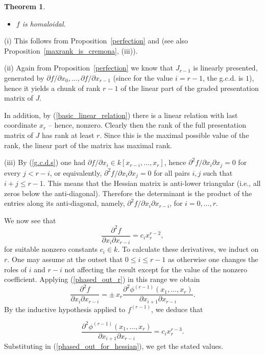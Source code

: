 \documentclass[11pt]{article}   %
\newtheorem{Theorem}{Theorem}
\theoremstyle{definition}
\numberwithin{Theorem}{section} \numberwithin{equation}{section}
\def\demo{\noindent{\it Proof. }}
\begin{document}
{\begin{Theorem}
\begin{itemize}
\item[{\rm (iv)}] $f$ is homaloidal.
\end{itemize}
\end{Theorem}
\demo (i) This follows from Proposition~\ref{perfection} and
\cite[Example 2.4]{cremona} (see also
Proposition~\ref{maxrank_is_cremona}, (iii)).

\medskip

(ii)  Again from Proposition~\ref{perfection}  we know that
$J_{r-1}$ is linearly presented, generated by $\partial f/\partial
x_0,\ldots,\partial f/\partial x_{r-1}$ (since for the value
$i=r-1$, the g.c.d. is $1$), hence it yields a chunk of rank $r-1$
of the linear part of the graded presentation matrix of $J$.

In addition, by (\ref{basic_linear_relation}) there is a linear
relation with last coordinate $x_r$ -- hence, nonzero. Clearly then
the rank of the full presentation matrix of $J$ has rank at least
$r$. Since this is the maximal possible value of the rank, the
linear part of the matrix has maximal rank.

\medskip

(iii) By (\ref{g.c.d.s}) one had $\partial f/\partial x_i\in
k[x_{r-i},\ldots, x_r]$, hence $\partial^2f/\partial x_i\partial
x_j=0$ for every $j<r-i$, or equivalently,  $\partial^2f/\partial
x_i\partial x_j=0$ for all pairs $i,j$ such that $i+j\leq r-1$. This
means that the Hessian matrix is anti-lower triangular (i.e., all
zeros below the anti-diagonal). Therefore the determinant is the
product of the entries along its anti-diagonal, namely,
$\partial^2f/\partial x_i\partial x_{r-i}$, for $i=0,\ldots, r$.

We now see that
$$\frac{\partial^2f}{\partial x_i\partial x_{r-i}}=c_ix_r^{r-2},$$
for suitable nonzero constants $c_i\in k$.
 To calculate these derivatives, we induct on $r$.
 One may assume at the outset that $0\leq i\leq r-1$ as otherwise
 one changes the roles of $i$ and $r-i$ not affecting the result except
for the value of the nonzero coefficient. Applying
(\ref{phased_out_r}) in this range we obtain
\begin{equation}\label{phased_out_for_hessian}
\frac{\partial^2f}{\partial x_i\partial x_{r-i}}=\pm\,
x_r\frac{\partial^2\phi^{(r-1)}(x_1,\ldots,x_r)}{\partial
x_{i+1}\partial x_{r-i}}. \end{equation} By the inductive hypothesis
applied  to $f^{(r-1)}$, we deduce that

$$\frac{\partial^2\phi^{(r-1)}(x_1,\ldots,x_r)}{\partial
x_{i+1}\partial x_{r-i}}=c_ix_r^{r-3}.$$
Substituting in
(\ref{phased_out_for_hessian}), we get the stated values.


}
\end{document}
